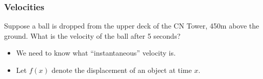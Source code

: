 \begin{frame}
\frametitle{Velocities}
\begin{example}[Example 3, p. 137]
Suppose a ball is dropped from the upper deck of the CN Tower, 450m above the ground.  What is the velocity of the ball after 5 seconds?
\end{example}
\begin{itemize}
\item<2->  We need to know what ``instantaneous'' velocity is.
\item<3->  Let $f(x)$ denote the displacement of an object at time $x$.
\end{itemize}
\begin{center}
\begin{columns}[c]
\ %
\ %
\end{columns}
\end{center}
\end{frame}

